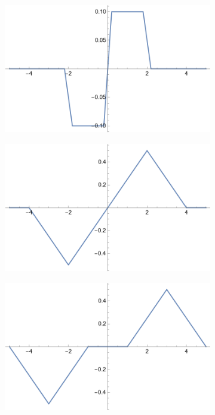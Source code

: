 \documentclass[hyperref, a4paper]{article}
\begin{document}
\begin{figure}
    \centering
    \begin{subfigure}{0.3\textwidth}
        \includegraphics[width=\textwidth]{plots/config-0.1.png}
    \end{subfigure}
    \begin{subfigure}{0.3\textwidth}
        \includegraphics[width=\textwidth]{plots/config-1.png}
    \end{subfigure}
    \begin{subfigure}{0.3\textwidth}
        \includegraphics[width=\textwidth]{plots/config-1.5.png}

\end{subfigure}
\end{figure}
\end{document}

